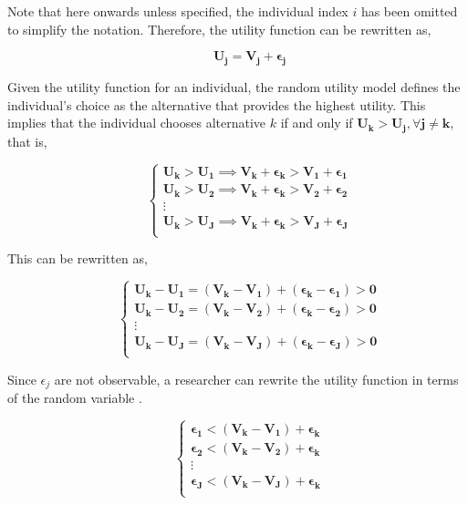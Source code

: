 \documentclass[a4paper,11pt]{article}
\begin{document}
    Note that here onwards unless specified, the individual index $i$ has been omitted to simplify the notation. Therefore, the utility function can be rewritten as, 

    \begin{equation*}
        \qquad \mathbf{U_{j}} = \mathbf{V_{j}} + \mathbf{\epsilon_{j}}    
    \end{equation*}

    Given the utility function for an individual, the random utility model defines the individual's choice as the alternative that provides the highest utility. This implies that the individual chooses alternative $k$ if and only if $\mathbf{U_{k} > U_{j},\forall j \neq k}$, that is, 

     \begin{equation*}
        \qquad \begin{cases}
        \mathbf{U_{k} > U_{1} \implies V_{k} + \epsilon_{k} > V_{1} + \epsilon_{1}}\\
        \mathbf{U_{k} > U_{2} \implies V_{k} + \epsilon_{k} > V_{2} + \epsilon_{2}}\\
        \vdots\\
        \mathbf{U_{k} > U_{J} \implies V_{k} + \epsilon_{k} > V_{J} + \epsilon_{J}}\\
        \end{cases} 
    \end{equation*}

    This can be rewritten as,

    \begin{equation*}
        \qquad \begin{cases}
        \mathbf{U_{k} - U_{1} = (V_{k} - V_{1}) + (\epsilon_{k} -\epsilon_{1}) > 0}\\
        \mathbf{U_{k} - U_{2} = (V_{k} - V_{2}) + (\epsilon_{k} -\epsilon_{2}) > 0}\\
        \vdots\\
        \mathbf{U_{k} - U_{J} = (V_{k} - V_{J}) + (\epsilon_{k} -\epsilon_{J}) > 0}\\        
        \end{cases} 
    \end{equation*}

    Since $\epsilon_{j}$ are not observable, a researcher can rewrite the utility function in terms of the random variable \cite{Croissant}.

    \begin{equation*}
        \qquad \begin{cases}
        \mathbf{\epsilon_{1} < (V_{k} - V_{1}) + \epsilon_{k}}\\
        \mathbf{\epsilon_{2} < (V_{k} - V_{2}) + \epsilon_{k}}\\
        \vdots\\
        \mathbf{\epsilon_{J} < (V_{k} - V_{J}) + \epsilon_{k}}\\        
        \end{cases} 
    \end{equation*}
\end{document}

